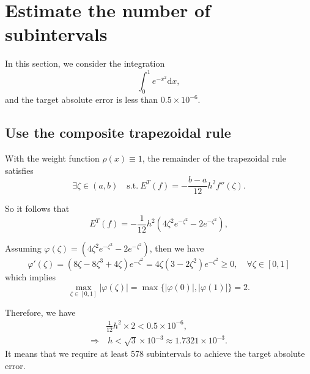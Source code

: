 \documentclass[a4paper]{article}
\begin{document}
\section{Estimate the number of subintervals}

In this section, we consider the integration
\begin{equation}
    \int_0^1 e^{-x^2} \mathrm{d} x,
    \label{eq:2_integration}
\end{equation}
and the target absolute error is less than $0.5 \times 10^{-6}$.

\subsection{Use the composite trapezoidal rule}
\label{sec:2_composite_trapezoidal}

With the weight function $\rho(x) \equiv 1$, the remainder of the trapezoidal rule satisfies
\begin{equation}
    \exists \zeta \in (a, b) \quad \mathrm{s.t.}\ E^T(f) = -\frac{b - a}{12}h^2 f''(\zeta).
    \label{eq:2_trapezoidal_error}
\end{equation}

So it follows that 
\begin{equation}
    E^T(f) = -\frac{1}{12}h^2 (4\zeta^2 e^{-\zeta^2} - 2e^{-\zeta^2}),
    \label{eq:2_trapezoidal_error_final}
\end{equation}

Assuming $\varphi(\zeta) = (4\zeta^2 e^{-\zeta^2} - 2e^{-\zeta^2})$, then we have
\begin{equation}
    \varphi'(\zeta) = (8\zeta - 8\zeta^3 + 4\zeta)e^{-\zeta^2} = 4\zeta(3 - 2\zeta^2)e^{-\zeta^2} \geqslant 0, \quad \forall \zeta \in [0, 1]
    \label{eq:2_trapezoidal_derivative}
\end{equation}
which implies 
\begin{equation}
    \max_{\zeta \in [0, 1]} |\varphi(\zeta)| = \max\{|\varphi(0)|, |\varphi(1)|\} = 2.
    \label{eq:2_trapezoidal_max}
\end{equation}

Therefore, we have
\begin{equation}
    \begin{aligned}
        & \frac{1}{12}h^2 \times 2 < 0.5 \times 10^{-6}, \\
        \Rightarrow &\ h < \sqrt{3} \times 10^{-3} \approx 1.7321 \times 10^{-3}.
    \end{aligned}
    \label{eq:2_trapezoidal_error_final_approx}
\end{equation}
It means that we require at least 578 subintervals to achieve the target absolute error.
\end{document}

